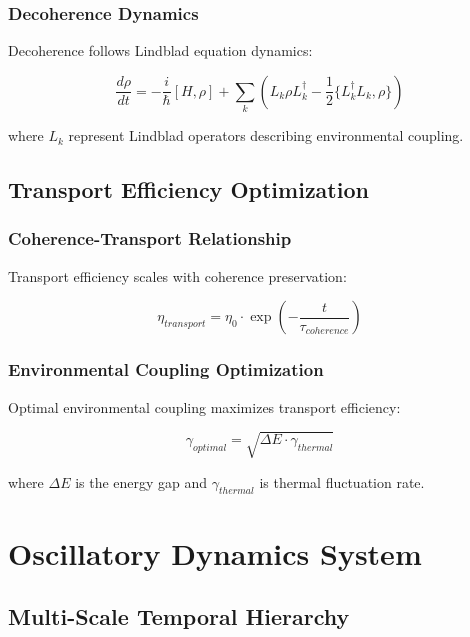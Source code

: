 \documentclass[12pt,a4paper]{article}
\begin{document}
\subsubsection{Decoherence Dynamics}

Decoherence follows Lindblad equation dynamics:

\begin{equation}
\frac{d\rho}{dt} = -\frac{i}{\hbar}[H, \rho] + \sum_k \left(L_k \rho L_k^\dagger - \frac{1}{2}\{L_k^\dagger L_k, \rho\}\right)
\end{equation}

where $L_k$ represent Lindblad operators describing environmental coupling.

\subsection{Transport Efficiency Optimization}

\subsubsection{Coherence-Transport Relationship}

Transport efficiency scales with coherence preservation:

\begin{equation}
\eta_{transport} = \eta_0 \cdot \exp\left(-\frac{t}{\tau_{coherence}}\right)
\end{equation}

\subsubsection{Environmental Coupling Optimization}

Optimal environmental coupling maximizes transport efficiency:

\begin{equation}
\gamma_{optimal} = \sqrt{\Delta E \cdot \gamma_{thermal}}
\end{equation}

where $\Delta E$ is the energy gap and $\gamma_{thermal}$ is thermal fluctuation rate.

\section{Oscillatory Dynamics System}

\subsection{Multi-Scale Temporal Hierarchy}
\end{document}
